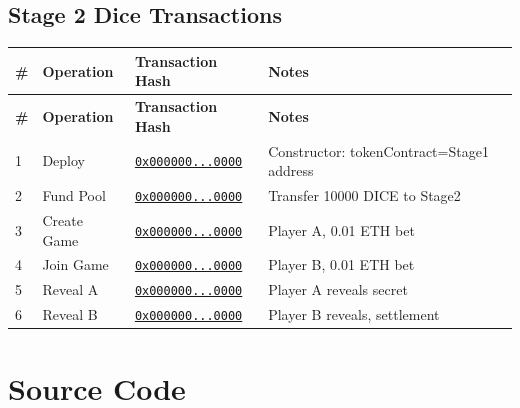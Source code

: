 \documentclass[10pt,a4paper]{article}
\newcommand{\missingtx}{\textcolor{red}{\href{https://sepolia.etherscan.io/tx/0x0000000000000000000000000000000000000000000000000000000000000000}{\texttt{0x000000...0000}}}}
\begin{document}
\subsection*{Stage 2 Dice Transactions}
\begin{longtable}{@{}p{}p{}p{}p{}@{}}
\toprule
\textbf{\#} & \textbf{Operation} & \textbf{Transaction Hash} & \textbf{Notes} \\
\midrule
\endfirsthead
\toprule
\textbf{\#} & \textbf{Operation} & \textbf{Transaction Hash} & \textbf{Notes} \\
\midrule
\endhead
1 & Deploy & \missingtx & Constructor: tokenContract=Stage1 address \\
2 & Fund Pool & \missingtx & Transfer 10000 DICE to Stage2 \\
3 & Create Game & \missingtx & Player A, 0.01 ETH bet \\
4 & Join Game & \missingtx & Player B, 0.01 ETH bet \\
5 & Reveal A & \missingtx & Player A reveals secret \\
6 & Reveal B & \missingtx & Player B reveals, settlement \\
\bottomrule
\end{longtable}

\section{Source Code}
\end{document}
